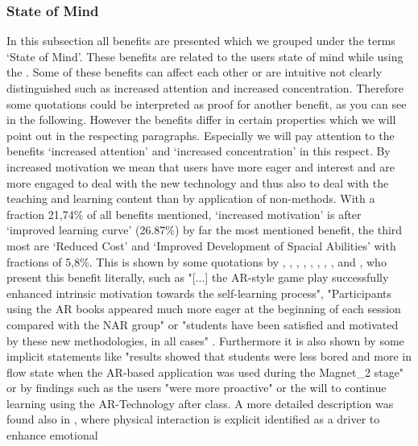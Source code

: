 \subsubsection{State of Mind}
In this subsection all benefits are presented which we grouped under the terms ‘State of Mind’. These benefits are related to the users state of mind while using the \AR \appns. Some of these benefits can affect 
each other or are intuitive not clearly distinguished such as increased attention and increased concentration. Therefore some quotations could be interpreted as proof for another benefit, as you can see in the following.
However the benefits differ in certain properties which we will point out in the respecting paragraphs. Especially we will pay attention to the benefits ‘increased attention’ and ‘increased concentration’ in this respect.
By increased motivation we mean that users have more eager and interest and are more engaged to deal with the new technology and thus also to deal with the teaching and learning content than by application of non-\AR methods. With a fraction 21,74\% of all benefits mentioned, 
‘increased motivation’ is after ‘improved learning curve’ (26.87\%) by far the most mentioned benefit, the third most are ‘Reduced Cost' and ‘Improved Development of Spacial Abilities’ with fractions of 5,8\%.
This is shown by some quotations by \cite{Dunser.2012}, \cite{Iwata.2011}, \cite{Kamarainen.2013}, \cite{Liu.2009b}, \cite{MartinGutierrez.2011}, \cite{MartinGutierrez.2011}, \cite{Tian.2013}, \cite{Redondo.2013}, 
\cite{VateULan.2012} and \cite{Yen.2013}, who present this benefit literally, such as "[...] the AR-style game play successfully enhanced intrinsic motivation towards the self-learning process"\autocite[113]{Iwata.2011}, "Participants 
using the AR books appeared much more eager at the beginning of each session compared with the NAR group"\autocite[112]{Dunser.2012} or "students have been satisfied and motivated by these new methodologies, in all cases"
\autocite[60]{Redondo.2013}. Furthermore it is also shown by some implicit statements like "results showed that students were less bored and more in flow state
when the AR-based application was used during the Magnet\_2 stage"\autocite[8]{Ibanez.2014} or by findings such as the users "were more proactive"\autocite[10]{Chang.2014}\mulcit\autocite[cf.][187]{Zhang.2014} or the will to continue learning using
the AR-Technology after class\autocite[8]{Liu.2009b}. A more detailed description was found also in \cite{Iwata.2011}, where physical interaction is explicit identified as a driver to enhance emotional
